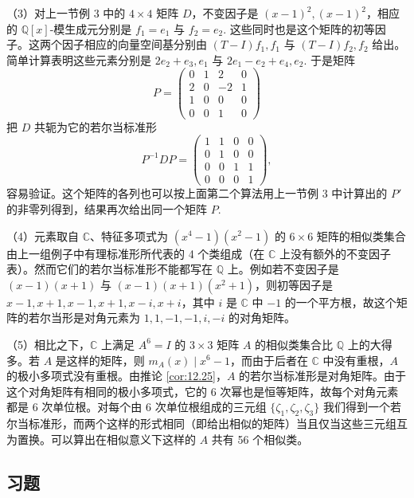 \begin{example}
（3）对上一节例 3 中的 \(4 \times 4\) 矩阵 \(D\)，不变因子是 \((x-1)^2, (x-1)^2\)，相应的 \(\mathbb{Q}[x]\)-模生成元分别是 \(f_1 = e_1\) 与 \(f_2 = e_2\). 这些同时也是这个矩阵的初等因子。这两个因子相应的向量空间基分别由 \((T-I)f_1, f_1\) 与 \((T-I)f_2, f_2\) 给出。简单计算表明这些元素分别是 \(2e_2+e_3, e_1\) 与 \(2e_1-e_2+e_4, e_2\). 于是矩阵
\[
P = \begin{pmatrix} 0 & 1 & 2 & 0 \\ 2 & 0 & -2 & 1 \\ 1 & 0 & 0 & 0 \\ 0 & 0 & 1 & 0 \end{pmatrix}
\]
把 \(D\) 共轭为它的若尔当标准形
\[
P^{-1}DP = \begin{pmatrix} 1 & 1 & 0 & 0 \\ 0 & 1 & 0 & 0 \\ 0 & 0 & 1 & 1 \\ 0 & 0 & 0 & 1 \end{pmatrix},
\]
容易验证。这个矩阵的各列也可以按上面第二个算法用上一节例 3 中计算出的 \(P'\) 的非零列得到，结果再次给出同一个矩阵 \(P\).

（4）元素取自 \(\mathbb{C}\)、特征多项式为 \((x^4-1)(x^2-1)\) 的 \(6 \times 6\) 矩阵的相似类集合由上一组例子中有理标准形所代表的 4 个类组成（在 \(\mathbb{C}\) 上没有额外的不变因子表）。然而它们的若尔当标准形不能都写在 \(\mathbb{Q}\) 上。例如若不变因子是 \((x-1)(x+1)\) 与 \((x-1)(x+1)(x^2+1)\)，则初等因子是 \(x-1, x+1, x-1, x+1, x-i, x+i\)，其中 \(i\) 是 \(\mathbb{C}\) 中 \(-1\) 的一个平方根，故这个矩阵的若尔当形是对角元素为 \(1, 1, -1, -1, i, -i\) 的对角矩阵。

（5）相比之下，\(\mathbb{C}\) 上满足 \(A^6 = I\) 的 \(3 \times 3\) 矩阵 \(A\) 的相似类集合比 \(\mathbb{Q}\) 上的大得多。若 \(A\) 是这样的矩阵，则 \(m_A(x) \mid x^6-1\)，而由于后者在 \(\mathbb{C}\) 中没有重根，\(A\) 的极小多项式没有重根。由推论 \ref{cor:12.25}，\(A\) 的若尔当标准形是对角矩阵。由于这个对角矩阵有相同的极小多项式，它的 6 次幂也是恒等矩阵，故每个对角元素都是 6 次单位根。对每个由 6 次单位根组成的三元组 \(\{\zeta_1, \zeta_2, \zeta_3\}\) 我们得到一个若尔当标准形，而两个这样的形式相同（即给出相似的矩阵）当且仅当这些三元组互为置换。可以算出在相似意义下这样的 \(A\) 共有 56 个相似类。
\end{example}

\subsection*{习题}

